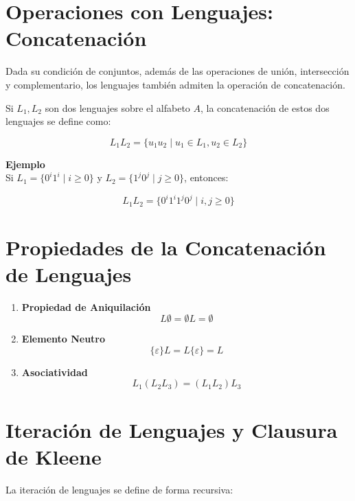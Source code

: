 \documentclass[12pt]{report} %
\begin{document}
\hypertarget{operaciones-con-lenguajes-concatenaciuxf3n}{%
\section{Operaciones con Lenguajes:
Concatenación}\label{operaciones-con-lenguajes-concatenaciuxf3n}}

Dada su condición de conjuntos, además de las operaciones de unión,
intersección y complementario, los lenguajes también admiten la
operación de concatenación.

Si \(L_1, L_2\) son dos lenguajes sobre el alfabeto \(A\), la
concatenación de estos dos lenguajes se define como:

\[
L_1L_2 = \{u_1u_2 \mid u_1 \in L_1, u_2 \in L_2\}
\]

\textbf{Ejemplo}\\
Si \(L_1 = \{0^i1^i \mid i \geq 0\}\) y
\(L_2 = \{1^j0^j \mid j \geq 0\}\), entonces:

\[
L_1L_2 = \{0^i1^i1^j0^j \mid i, j \geq 0\}
\]

\hypertarget{propiedades-de-la-concatenaciuxf3n-de-lenguajes}{%
\section{Propiedades de la Concatenación de
Lenguajes}\label{propiedades-de-la-concatenaciuxf3n-de-lenguajes}}

\begin{enumerate}
\def\labelenumi{\arabic{enumi}.}
\item
  \textbf{Propiedad de Aniquilación}\\
  \[L \emptyset = \emptyset L = \emptyset\]
\item
  \textbf{Elemento Neutro}\\
  \[\{\varepsilon\}L = L\{\varepsilon\} = L\]
\item
  \textbf{Asociatividad}\\
  \[L_1(L_2L_3) = (L_1L_2)L_3\]
\end{enumerate}

\hypertarget{iteraciuxf3n-de-lenguajes-y-clausura-de-kleene}{%
\section{Iteración de Lenguajes y Clausura de
Kleene}\label{iteraciuxf3n-de-lenguajes-y-clausura-de-kleene}}

La iteración de lenguajes se define de forma recursiva:
\end{document}
